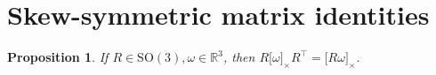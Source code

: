 \documentclass[letter,10pt]{article}
\newcommand{\SO}[1]{ \mathrm{SO(#1)} }
\newcommand{\real}{\mathbb{R}}
\newcommand{\asym}[1]{{\lbrack #1\rbrack}_\times{}}
\newtheorem{prop}{Proposition}[section]
\begin{document}








\clearpage

\appendix
\section{Skew-symmetric matrix identities}

\begin{prop}
If $R \in\SO{3}, \omega\in\real^3$, then $R\asym{\omega} R^\top=\asym{R\omega}$.
\end{prop}
\end{document}

